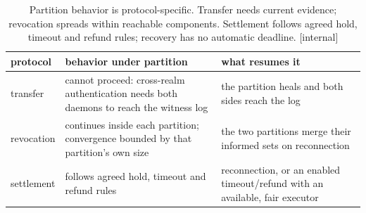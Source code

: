 %
\begin{table}[H]
\centering
\caption{Partition behavior is protocol-specific. Transfer needs current evidence;
revocation spreads within reachable components. Settlement follows agreed
hold, timeout and refund rules; recovery has no automatic deadline. [internal]}
\label{tab:fh-partition}
\small
\renewcommand{\arraystretch}{1.2}
\begin{tabularx}{\linewidth}{@{}l >{\raggedright\arraybackslash}X >{\raggedright\arraybackslash}X@{}}
\toprule
\textbf{protocol} & \textbf{behavior under partition} & \textbf{what resumes it} \\
\midrule
transfer & cannot proceed: cross-realm authentication needs both daemons to reach the witness log & the partition heals and both sides reach the log \\
revocation & continues inside each partition; convergence bounded by that partition's own size & the two partitions merge their informed sets on reconnection \\
settlement & follows agreed hold, timeout and refund rules & reconnection, or an enabled timeout/refund with an available, fair executor \\
\bottomrule
\end{tabularx}
\end{table}
